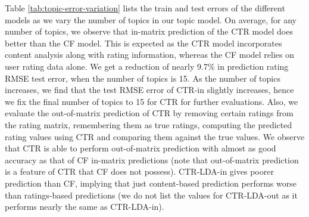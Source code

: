 \documentclass{article} %
\begin{document}
Table \ref{tab:topic-error-variation} lists the train and test errors of the
different models as we vary the number of topics in our topic model. On average,
for any number of topics, we observe that in-matrix prediction of the CTR model
does better than the CF model. This is expected as the CTR model incorporates
content analysis along with rating information, whereas the CF model relies on
user rating data alone. We get a reduction of nearly 9.7\% in prediction rating
RMSE test error, when the number of topics is 15. As the number of topics 
increases, we find that the test RMSE error of CTR-in slightly increases, hence
we fix the final number of topics to 15 for CTR for further evaluations. Also, 
we evaluate the out-of-matrix prediction of CTR by removing certain ratings from
the rating matrix, remembering them as true ratings, computing the predicted
rating values using CTR and comparing them against the true values. We observe
that CTR is able to perform out-of-matrix prediction with almost as good accuracy as that of CF in-matrix predictions (note that out-of-matrix prediction is a 
feature of CTR that CF does not possess). CTR-LDA-in gives poorer prediction 
than CF, implying that just content-based prediction performs worse than ratings-based predictions (we do not list the values for CTR-LDA-out as it performs nearly the same as CTR-LDA-in). 
\end{document}

